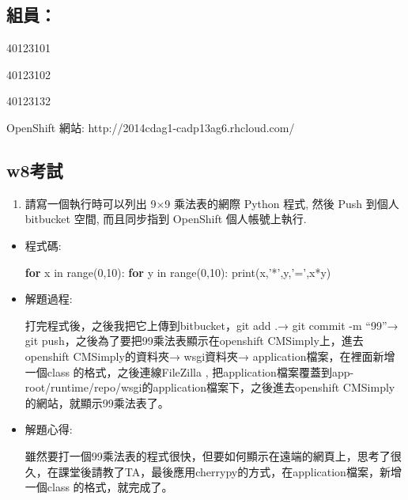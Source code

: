 \documentclass[]{article}
\newenvironment{Shaded}{}{}
\newcommand{\KeywordTok}[1]{\textcolor[rgb]{0.00,0.44,0.13}{\textbf{{#1}}}}
\newcommand{\DataTypeTok}[1]{\textcolor[rgb]{0.56,0.13,0.00}{{#1}}}
\newcommand{\DecValTok}[1]{\textcolor[rgb]{0.25,0.63,0.44}{{#1}}}
\newcommand{\StringTok}[1]{\textcolor[rgb]{0.25,0.44,0.63}{{#1}}}
\newcommand{\NormalTok}[1]{{#1}}
\begin{document}
\subsection{組員：}\label{ux7d44ux54e1}

40123101

40123102

40123132

OpenShift 網站: http://2014cdag1-cadp13ag6.rhcloud.com/

\subsection{w8考試}\label{w8ux8003ux8a66}

\begin{enumerate}
\def\labelenumi{\arabic{enumi}.}
\itemsep1pt\parskip0pt
\item
  請寫一個執行時可以列出 9×9 乘法表的網際 Python 程式, 然後 Push 到個人
  bitbucket 空間, 而且同步指到 OpenShift 個人帳號上執行.
\end{enumerate}

\begin{itemize}
\item
  程式碼:

\begin{Shaded}
\begin{Highlighting}[]
    \KeywordTok{for} \NormalTok{x in }\DataTypeTok{range}\NormalTok{(}\DecValTok{0}\NormalTok{,}\DecValTok{10}\NormalTok{):}
        \KeywordTok{for} \NormalTok{y in }\DataTypeTok{range}\NormalTok{(}\DecValTok{0}\NormalTok{,}\DecValTok{10}\NormalTok{):}
            \DataTypeTok{print}\NormalTok{(x,}\StringTok{'*'}\NormalTok{,y,}\StringTok{'='}\NormalTok{,x*y)}
\end{Highlighting}
\end{Shaded}
\item
  解題過程:

  打完程式後，之後我把它上傳到bitbucket，git add .→ git commit -m
  ``99''→ git push，之後為了要把99乘法表顯示在openshift
  CMSimply上，進去openshift CMSimply的資料夾→ wsgi資料夾→
  application檔案，在裡面新增一個class 的格式，之後連線FileZilla ,
  把application檔案覆蓋到app-root/runtime/repo/wsgi的application檔案下，之後進去openshift
  CMSimply的網站，就顯示99乘法表了。
\item
  解題心得:

  雖然要打一個99乘法表的程式很快，但要如何顯示在遠端的網頁上，思考了很久，在課堂後請教了TA，最後應用cherrypy的方式，在application檔案，新增一個class
  的格式，就完成了。
\end{itemize}
\end{document}
